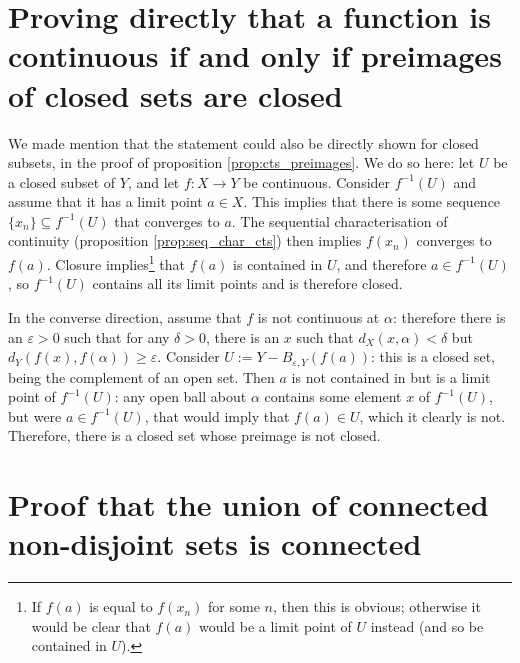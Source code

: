 \begin{appendices}
\section{Proving directly that a function is continuous if and only if preimages of closed sets are closed}
We made mention that the statement could also be directly shown for closed subsets, in the proof of proposition \ref{prop:cts_preimages}. We do so here: let $U$ be a closed subset of $Y$, and let \mbox{$f : X \to Y$} be continuous. Consider $f^{-1}(U)$ and assume that it has a limit point $a\in X$. This implies that there is some sequence $\{x_{n}\}\subseteq f^{-1}(U)$ that converges to $a$. The sequential characterisation of continuity (proposition \ref{prop:seq_char_cts}) then implies $f(x_{n})$ converges to $f(a)$. Closure implies\footnote{If $f(a)$ is equal to $f(x_{n})$ for some $n$, then this is obvious; otherwise it would be clear that $f(a)$ would be a limit point of $U$ instead (and so be contained in $U$).} that $f(a)$ is contained in $U$, and therefore \mbox{$a\in f^{-1}(U)$,} so $f^{-1}(U)$ contains all its limit points and is therefore closed.

In the converse direction, assume that $f$ is not continuous at $\alpha$: therefore there is an $\varepsilon > 0$ such that for any $\delta > 0$, there is an $x$ such that \mbox{$d_{X}(x,\alpha) < \delta$} but \mbox{$d_{Y}( f(x), f(\alpha) ) \geq \varepsilon$.} Consider \mbox{$U := Y - B_{\varepsilon, Y}( f(a) )$:} this is a closed set, being the complement of an open set. Then $a$ is not contained in but is a limit point of $f^{-1}(U)$: any open ball about $\alpha$ contains some element $x$ of $f^{-1}(U)$, but were \mbox{$a\in f^{-1}(U)$,} that would imply that \mbox{$f(a)\in U$,} which it clearly is not. Therefore, there is a closed set whose preimage is not closed.

\section{Proof that the union of connected non-disjoint sets is connected}



\end{appendices}
